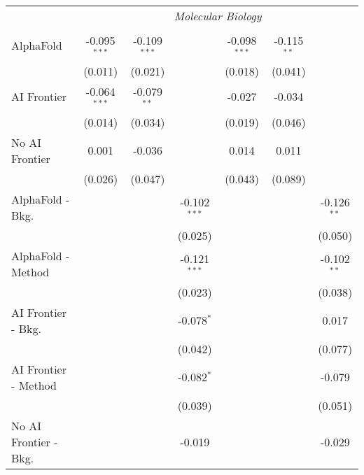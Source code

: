 \begin{tabular}{lcccccc}
 & \multicolumn{6}{c}{\textit{Molecular Biology}} \\ \\
   AlphaFold               & -0.095$^{***}$ & -0.109$^{***}$ &                & -0.098$^{***}$ & -0.115$^{**}$ &   \\   
                           & (0.011)        & (0.021)        &                & (0.018)        & (0.041)       &   \\   
   AI Frontier             & -0.064$^{***}$ & -0.079$^{**}$  &                & -0.027         & -0.034        &   \\   
                           & (0.014)        & (0.034)        &                & (0.019)        & (0.046)       &   \\   
   No AI Frontier          & 0.001          & -0.036         &                & 0.014          & 0.011         &   \\   
                           & (0.026)        & (0.047)        &                & (0.043)        & (0.089)       &   \\   
   AlphaFold - Bkg.        &                &                & -0.102$^{***}$ &                &               & -0.126$^{**}$\\   
                           &                &                & (0.025)        &                &               & (0.050)\\   
   AlphaFold - Method      &                &                & -0.121$^{***}$ &                &               & -0.102$^{**}$\\   
                           &                &                & (0.023)        &                &               & (0.038)\\   
   AI Frontier - Bkg.      &                &                & -0.078$^{*}$   &                &               & 0.017\\   
                           &                &                & (0.042)        &                &               & (0.077)\\   
   AI Frontier - Method    &                &                & -0.082$^{*}$   &                &               & -0.079\\   
                           &                &                & (0.039)        &                &               & (0.051)\\   
   No AI Frontier - Bkg.   &                &                & -0.019         &                &               & -0.029\\   

\end{tabular}
